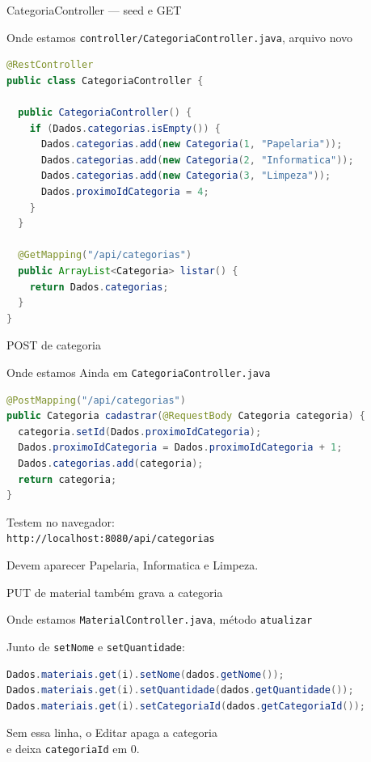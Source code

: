 \documentclass[aspectratio=169,11pt]{beamer}
\newcommand{\onde}[1]{%
  \begin{block}{Onde estamos}
    #1
  \end{block}
}
\begin{document}
\begin{frame}[fragile,shrink=5]{CategoriaController --- seed e GET}
  \onde{\texttt{controller/CategoriaController.java}, arquivo novo}

\begin{lstlisting}[language=Java,basicstyle=\ttfamily\scriptsize]
@RestController
public class CategoriaController {

  public CategoriaController() {
    if (Dados.categorias.isEmpty()) {
      Dados.categorias.add(new Categoria(1, "Papelaria"));
      Dados.categorias.add(new Categoria(2, "Informatica"));
      Dados.categorias.add(new Categoria(3, "Limpeza"));
      Dados.proximoIdCategoria = 4;
    }
  }

  @GetMapping("/api/categorias")
  public ArrayList<Categoria> listar() {
    return Dados.categorias;
  }
}
\end{lstlisting}
\end{frame}

\begin{frame}[fragile]{POST de categoria}
  \onde{Ainda em \texttt{CategoriaController.java}}

\begin{lstlisting}[language=Java,basicstyle=\ttfamily\footnotesize]
@PostMapping("/api/categorias")
public Categoria cadastrar(@RequestBody Categoria categoria) {
  categoria.setId(Dados.proximoIdCategoria);
  Dados.proximoIdCategoria = Dados.proximoIdCategoria + 1;
  Dados.categorias.add(categoria);
  return categoria;
}
\end{lstlisting}

  \vspace{0.4em}
  Testem no navegador:\\
  \texttt{http://localhost:8080/api/categorias}

  \vspace{0.3em}
  Devem aparecer Papelaria, Informatica e Limpeza.
\end{frame}

\begin{frame}[fragile]{PUT de material também grava a categoria}
  \onde{\texttt{MaterialController.java}, método \texttt{atualizar}}

  Junto de \texttt{setNome} e \texttt{setQuantidade}:

\begin{lstlisting}[language=Java,basicstyle=\ttfamily\footnotesize]
Dados.materiais.get(i).setNome(dados.getNome());
Dados.materiais.get(i).setQuantidade(dados.getQuantidade());
Dados.materiais.get(i).setCategoriaId(dados.getCategoriaId());
\end{lstlisting}

  \vspace{0.4em}
  Sem essa linha, o Editar apaga a categoria\\
  e deixa \texttt{categoriaId} em 0.
\end{frame}
\end{document}
